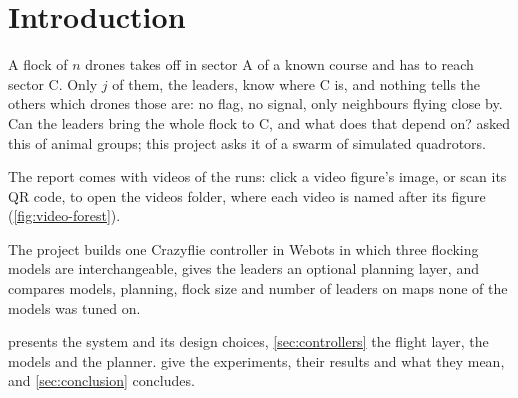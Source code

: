 \section{Introduction}
\label{sec:introduction}

A flock of $n$ drones takes off in sector A of a known course and has to
reach sector C. Only $j$ of them, the leaders, know where C is, and nothing
tells the others which drones those are: no flag, no signal, only neighbours
flying close by. Can the leaders bring the whole flock to C, and what does
that depend on? \citet{couzin2005} asked this of animal groups; this project
asks it of a swarm of simulated quadrotors.

The report comes with videos of the runs: click a video figure's image, or
scan its QR code, to open the videos folder, where each video is named
after its figure (\cref{fig:video-forest}).


The project builds
one Crazyflie controller in Webots in which three flocking models are
interchangeable, gives the leaders an optional planning layer, and compares
models, planning, flock size and number of leaders on maps none of the
models was tuned on.

 presents the system and its design choices, \cref{sec:controllers} the flight layer,
the models and the planner.  give
the experiments, their results and what they mean, and \cref{sec:conclusion}
concludes.
